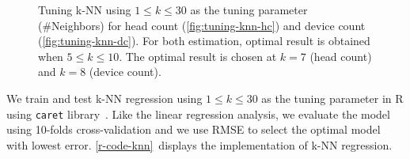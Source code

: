 	\begin{figure}[H]
		\begin{adjustwidth}{-1cm}{}
		\centering
		\end{adjustwidth}
		\caption[Tuning \ac{k-NN}.]
		{Tuning \ac{k-NN} using $1 \le k \le 30$ as the tuning parameter (\#Neighbors) for head count (\ref{fig:tuning-knn-hc}) and device count (\ref{fig:tuning-knn-dc}). For both estimation, optimal result is obtained when $5 \le k \le 10$. The optimal result is chosen at $k=7$ (head count) and $k=8$ (device count).}
		\label{fig:tuning-knn}
	\end{figure}

	We train and test \ac{k-NN} regression using $1 \le k \le 30$ as the tuning parameter in R using \verb|caret| library~\cite{caret}. Like the linear regression analysis, we evaluate the model using 10-folds cross-validation and we use \ac{RMSE} to select the optimal model with lowest error. \autoref{r-code-knn}~displays the implementation of \ac{k-NN} regression.

